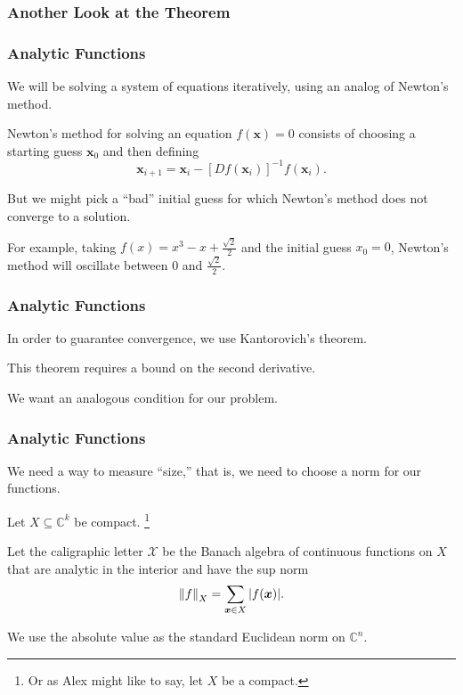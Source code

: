 \documentclass{beamer}
\newcommand{\C}{\mathbb{C}}
\newcommand{\bp}[1]{\bm{#1}}
\newcommand{\genericdel}[4]{%
  \ifcase#3\relax
  #1#4#2\or
  \bigl#1#4\bigr#2\or
  \Bigl#1#4\Bigr#2\or
  \biggl#1#4\biggr#2\or
  \Biggl#1#4\Biggr#2\else
  \left#1#4\right#2\fi
}
\newcommand{\enVert}[2][-1]{\genericdel\|\|{#1}{#2}}
\let\norm\enVert
\begin{document}
\begin{frame}
  \frametitle{Another Look at the Theorem}
  \begin{kamthm}
    \KAM{}
  \end{kamthm}
\end{frame}

\begin{frame}
  \frametitle{Analytic Functions}

  We will be solving a system of equations iteratively, using an analog of
  Newton's method.
  
  Newton's method for solving an equation $f(\bp{x}) = 0$ consists of choosing a
  starting guess $\bp{x}_0$ and then defining
  \begin{equation*}
    \bp{x}_{i+1} = \bp{x}_i - [Df(\bp{x}_i)]^{-1} f(\bp{x}_i).
  \end{equation*}

  But we might pick a ``bad'' initial guess for which Newton's method does not
  converge to a solution.

  For example, taking $f(x) = x^3 - x + \frac{\sqrt{2}}{2}$ and the initial
  guess $x_0 = 0$, Newton's method will oscillate between $0$ and
  $\frac{\sqrt{2}}{2}$.
\end{frame}

\begin{frame}
  \frametitle{Analytic Functions}
  In order to guarantee convergence, we use Kantorovich's theorem.

  This theorem requires a bound on the second derivative.

  We want an analogous condition for our problem.
\end{frame}

\begin{frame}
  \frametitle{Analytic Functions}
  We need a way to measure ``size,'' that is, we need to choose a norm for our
  functions.

  Let $X \subseteq \C^k$ be compact.
  \footnote{ Or as Alex might like to say, let $X$ be a compact.}

  Let the caligraphic letter $\mathcal{X}$ be the Banach algebra of continuous
  functions on $X$ that are analytic in the interior and have the sup norm
  \begin{equation*}
    \norm{f}_X = \sum_{\bp{x} \in X} |f(\bp{x})|.
  \end{equation*}

  We use the absolute value as the standard Euclidean norm on $\C^n$.
\end{frame}
\end{document}
